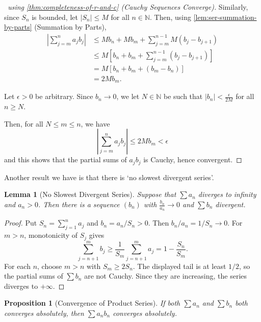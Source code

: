 \documentclass[11pt]{article}
\numberwithin{equation}{section}
\newtheorem{lemma}[theorem]{Lemma}
\newtheorem{proposition}[theorem]{Proposition}
\theoremstyle{definition}
\theoremstyle{remark}
\newcommand{\pqty}[1]{\left(#1\right)}
\newcommand{\bqty}[1]{\left[#1\right]}
\newcommand{\abs}[1]{\left|#1\right|}
\newcommand{\NN}{\mathbb N}
\begin{document}
\begin{proof}[\proofname\ using \autoref{thm:completeness-of-r-and-c} (Cauchy Sequences Converge)]
    Similarly, since \(S_n\) is bounded, let \(\abs{S_n} \leq M\) for all \(n \in \NN\). Then, using \autoref{lem:ser-summation-by-parts} (Summation by Parts),
    \begin{align*}
        \abs{\sum_{j = m}^{n} a_j b_j} &\leq M b_n + M b_m + \sum_{j = m}^{n - 1} M \pqty{b_j - b_{j + 1}} \\
        &\leq M \bqty{b_n + b_m + \sum_{j = m}^{n - 1} \pqty{b_j - b_{j + 1}}} \\
        &= M \bqty{b_n + b_m + \pqty{b_m - b_n}} \\
        &= 2 M b_m.
    \end{align*}

    Let \(\epsilon > 0\) be arbitrary. Since \(b_n \to 0\), we let \(N \in \NN\) be such that \(\abs{b_n} < \frac{\epsilon}{2M}\) for all \(n \geq N\).
    
    Then, for all \(N \leq m \leq n\), we have
    \[
        \abs{\sum_{j = m}^{n} a_j b_j} \leq 2 M b_m < \epsilon
    \]
    and this shows that the partial sums of \(a_j b_j\) is Cauchy, hence convergent.
\end{proof}

Another result we have is that there is `no slowest divergent series'.

\begin{lemma}[No Slowest Divergent Series]\label{analysis-unit-0063}
    \label{lem:no-slowest-divergent-series}%
    Suppose that \(\sum a_n\) diverges to infinity and \(a_n > 0\). Then there is a sequence \(\pqty{b_n}\) with \(\frac{b_n}{a_n} \to 0\) and \(\sum b_n\) divergent.
\end{lemma}

\begin{proof}
Put \(S_n=\sum_{j=1}^n a_j\) and \(b_n=a_n/S_n>0\). Then
\(b_n/a_n=1/S_n\to0\). For \(m>n\), monotonicity of \(S_j\) gives
\[
\sum_{j=n+1}^m b_j\ge\frac{1}{S_m}\sum_{j=n+1}^m a_j
=1-\frac{S_n}{S_m}.
\]
For each \(n\), choose \(m>n\) with \(S_m\ge2S_n\). The displayed tail is at
least \(1/2\), so the partial sums of \(\sum b_n\) are not Cauchy.
Since they are increasing, the series diverges to \(+\infty\).
\end{proof}

\begin{proposition}[Convergence of Product Series]\label{analysis-unit-0064}
    If both \(\sum a_n\) and \(\sum b_n\) both converges absolutely, then \(\sum a_n b_n\) converges absolutely.
\end{proposition}
\end{document}
